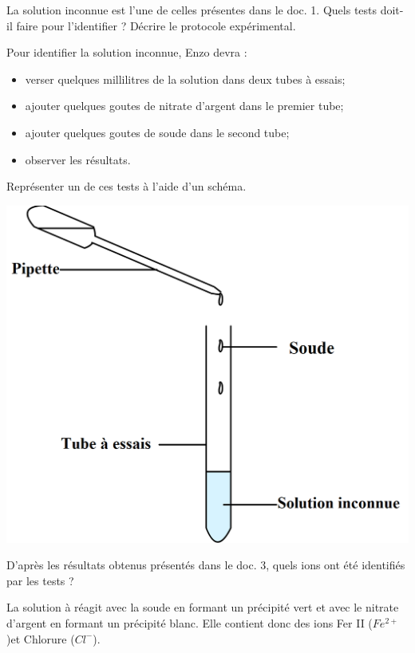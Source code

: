 \begin{questions}
	\question La solution inconnue est l'une de celles présentes dans le doc. 1. Quels tests doit-il faire pour l'identifier ? Décrire le protocole expérimental.
	\begin{solution}
		Pour identifier la solution inconnue, Enzo devra :
		\begin{itemize}
			\item verser quelques millilitres de la solution dans deux tubes à essais;
			\item ajouter quelques goutes de nitrate d'argent dans le premier tube;
			\item ajouter quelques goutes de soude dans le second tube;
			\item observer les résultats.
		\end{itemize}
	\end{solution}
	
	\question Représenter un de ces tests à l'aide d'un schéma.
	\begin{solution}
		\includegraphics[scale=0.2]{img/ajout-soude}
	\end{solution}
	
	\question D'après les résultats obtenus présentés dans le doc. 3, quels ions ont été identifiés par les tests ? 
	\begin{solution}
		La solution à réagit avec la soude en formant un précipité vert et avec le nitrate d'argent en formant un précipité blanc. Elle contient donc des ions Fer II ($Fe^{2+}$)et Chlorure ($Cl^-$).
	\end{solution}
	

\end{questions}
